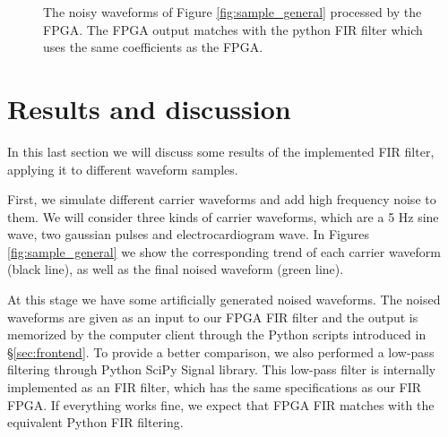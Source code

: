 \begin{figure}[hbt]
    \centering
    \caption{ The noisy waveforms of Figure \ref{fig:sample_general} processed by the FPGA. The FPGA output matches with the python FIR filter which uses the same coefficients as the FPGA.}
    \label{fig:real_general}
    
    
    
    \qquad
\end{figure}



\section{Results and discussion}
\label{sec:results}



In this last section we will discuss some results of the implemented FIR filter, applying it to different waveform samples.

First, we simulate different carrier waveforms and add high frequency noise to them. We will consider three kinds of carrier waveforms, which are a 5 Hz sine wave, two gaussian pulses and electrocardiogram wave. In Figures \ref{fig:sample_general} we show the corresponding trend of each carrier waveform (black line), as well as the final noised waveform (green line).




At this stage we have some artificially generated noised waveforms. The noised waveforms are given as an input to our FPGA FIR filter and the output is memorized by the computer client through the Python scripts introduced in §\ref{sec:frontend}. To provide a better comparison, we also performed a low-pass filtering through Python SciPy Signal library. This low-pass filter is internally implemented as an FIR filter, which has the same specifications as our FIR FPGA. If everything works fine, we expect that FPGA FIR matches with the equivalent Python FIR filtering.





